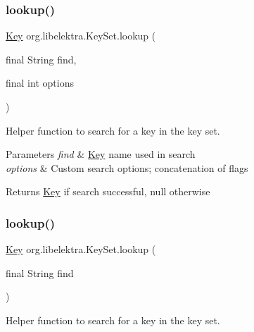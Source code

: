 \subsubsection{\texorpdfstring{lookup()}{lookup()}\hspace{0.1cm}{\footnotesize\ttfamily [3/4]}}
{\footnotesize\ttfamily \mbox{\hyperlink{classorg_1_1libelektra_1_1Key}{Key}} org.\+libelektra.\+Key\+Set.\+lookup (\begin{DoxyParamCaption}\item[{final String}]{find,  }\item[{final int}]{options }\end{DoxyParamCaption})\hspace{0.3cm}{\ttfamily [inline]}}



Helper function to search for a key in the key set. 


\begin{DoxyParams}{Parameters}
{\em find} & \mbox{\hyperlink{classorg_1_1libelektra_1_1Key}{Key}} name used in search \\
\hline
{\em options} & Custom search options; concatenation of flags \\
\hline
\end{DoxyParams}
\begin{DoxyReturn}{Returns}
\mbox{\hyperlink{classorg_1_1libelektra_1_1Key}{Key}} if search successful, null otherwise 
\end{DoxyReturn}
\mbox{\label{classorg_1_1libelektra_1_1KeySet_a69921726091c9a775bb8ece1f1e3a858}} 
\subsubsection{\texorpdfstring{lookup()}{lookup()}\hspace{0.1cm}{\footnotesize\ttfamily [4/4]}}
{\footnotesize\ttfamily \mbox{\hyperlink{classorg_1_1libelektra_1_1Key}{Key}} org.\+libelektra.\+Key\+Set.\+lookup (\begin{DoxyParamCaption}\item[{final String}]{find }\end{DoxyParamCaption})\hspace{0.3cm}{\ttfamily [inline]}}



Helper function to search for a key in the key set. 


